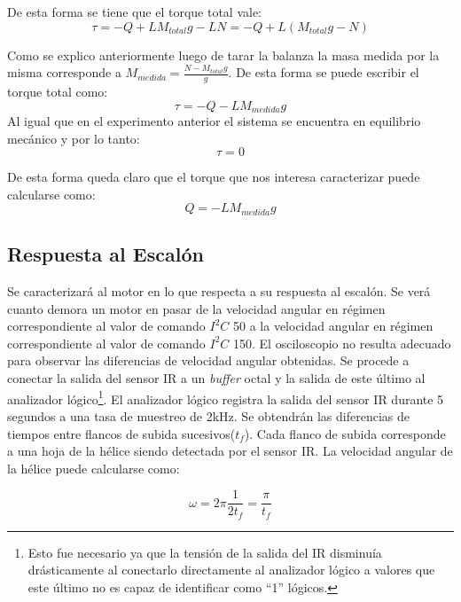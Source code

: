 \documentclass[main]{subfiles}
\begin{document}
De esta forma se tiene que el torque total vale:
\begin{equation}
\tau = -Q+LM_{total}g-LN=-Q+L(M_{total}g-N)
\end{equation}

Como se explico anteriormente luego de tarar la balanza la masa medida por la misma corresponde a $M_{medida}=\frac{N-M_{total}g}{g} $. De esta forma se puede escribir el torque total como:
\begin{equation}
\tau=-Q-LM_{medida}g
\end{equation}
Al igual que en el experimento anterior el sistema se encuentra en equilibrio mec\'anico y por lo tanto: 
\begin{equation}
\tau=0
\end{equation}

De esta forma queda claro que el torque que nos interesa caracterizar puede calcularse como:
\begin{equation}
Q=-LM_{medida}g
\end{equation}

\subsection{Respuesta al Escal\'on}
Se caracterizar\'a al motor en lo que respecta a su respuesta al escal\'on. Se ver\'a cuanto demora un motor en pasar de la velocidad angular en r\'egimen correspondiente al valor de comando $I^2C$ 50 a la velocidad angular en r\'egimen correspondiente al valor de comando $I^2C$ 150. El osciloscopio no resulta adecuado para observar las diferencias de velocidad angular obtenidas. Se procede a conectar la salida del sensor IR a un \emph{buffer} octal y la salida de este \'ultimo al analizador l\'ogico\footnote{ Esto fue necesario ya que la tensi\'on de la salida del IR disminu\'ia dr\'asticamente al conectarlo directamente al analizador l\'ogico a valores que este \'ultimo no es capaz de identificar como ``1'' l\'ogicos.}. El analizador l\'ogico registra la salida del sensor IR durante 5 segundos a una tasa de muestreo de 2kHz. Se obtendr\'an las diferencias de tiempos entre flancos de subida sucesivos($t_f$). Cada flanco de subida corresponde a una hoja de la h\'elice siendo detectada por el sensor IR. La velocidad angular de la h\'elice puede calcularse como:

\begin{equation}
\omega = 2 \pi \frac{1}{2t_f} = \frac{\pi}{t_f}
\end{equation}
 
\end{document}
